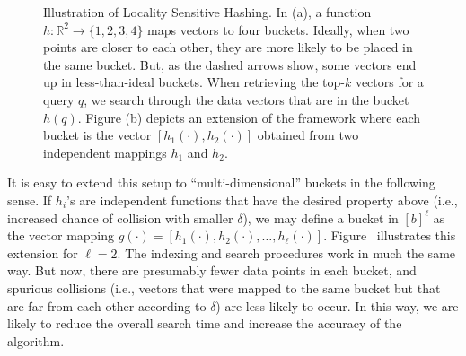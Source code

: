 \begin{figure}[t]
    \centering
    \caption{Illustration of Locality Sensitive Hashing. In (a), a function
    $h: \mathbb{R}^2 \rightarrow \{ 1, 2, 3, 4 \}$ maps vectors to four buckets.
    Ideally, when two points are closer to each other, they are more likely to be placed
    in the same bucket. But, as the dashed arrows show, some vectors end up in less-than-ideal
    buckets. When retrieving the top-$k$ vectors for a query $q$, we search through the data
    vectors that are in the bucket $h(q)$. Figure (b) depicts an extension of the framework
    where each bucket is the vector $[h_1(\cdot), h_2(\cdot)]$ obtained from two independent mappings
    $h_1$ and $h_2$.
    }
    \label{figure:lsh:intuition}
\end{figure}

It is easy to extend this setup to ``multi-dimensional'' buckets in the following sense.
If $h_i$'s are independent functions that have the desired property above (i.e., increased
chance of collision with smaller $\delta$), we may define
a bucket in $[b]^\ell$ as the vector mapping $g(\cdot) = [h_1(\cdot), h_2(\cdot), \ldots, h_\ell(\cdot)]$.
Figure~ illustrates this extension for $\ell=2$.
The indexing and search procedures work in much the same way. But now, there are
presumably fewer data points in each bucket, and
spurious collisions (i.e., vectors that were mapped to the same bucket 
but that are far from each other according to $\delta$) are less likely to occur.
In this way, we are likely to reduce the overall search time and increase
the accuracy of the algorithm.


